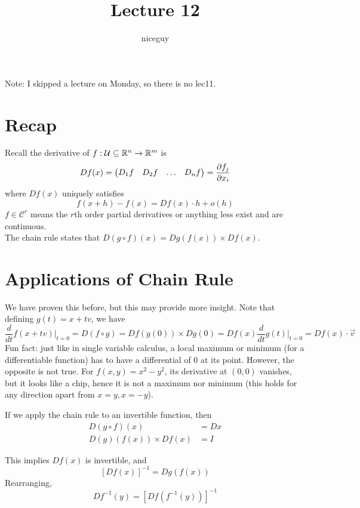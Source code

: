 \documentclass[12pt]{article}
\title{Lecture 12}
\author{niceguy}
\begin{document}
\maketitle

Note: I skipped a lecture on Monday, so there is no lec11.

\section{Recap}

Recall the derivative of $f: \mathcal U \subseteq \mathbb{R}^n \rightarrow \mathbb{R}^m$ is
$$Df(x) = \begin{pmatrix} D_1 f & D_2 f & \dots & D_nf \end{pmatrix} = \frac{\partial f_j}{\partial x_i}$$
where $Df(x)$ uniquely satisfies
$$f(x+h) - f(x) = Df(x)\cdot h + o(h)$$
$f\in \mathcal C^r$ means the $r$th order partial derivatives or anything less exist and are continuous. \\
The chain rule states that $D(g\circ f)(x) = Dg(f(x)) \times Df(x)$.

\section{Applications of Chain Rule}

We have proven this before, but this may provide more insight. Note that defining $g(t) = x + tv$, we have
$$\frac{d}{dt}f(x+tv) \Big |_{t=0} = D(f\circ g) = Df(g(0)) \times Dg(0) = Df(x) \frac{d}{dt} g(t) \Big |_{t=0} = Df(x) \cdot \vec v$$
Fun fact: just like in single variable calculus, a local maximum or minimum (for a differentiable function) has to have a differential of 0 at its point. However, the opposite is not true. For $f(x,y) = x^2 - y^2$, its derivative at $(0,0)$ vanishes, but it looks like a chip, hence it is not a maximum nor minimum (this holds for any direction apart from $x=y,x=-y$).

If we apply the chain rule to an invertible function, then
\begin{align*}
    D(g\circ f)(x) &= Dx \\
    D(g)(f(x)) \times Df(x) &= I
\end{align*}

This implies $Df(x)$ is invertible, and
$$[Df(x)]^{-1} = Dg(f(x))$$
Rearranging,
$$Df^{-1}(y) = \left[Df\left(f^{-1}(y)\right)\right]^{-1}$$
\end{document}
